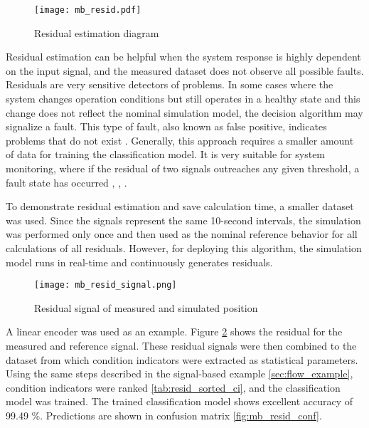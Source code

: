\begin{figure}[h!]
    \centering
    \texttt{[image: mb\_resid.pdf]}
    \caption{Residual estimation diagram}
    \label{fig:mb_resid_workflow}
\end{figure}

Residual estimation can be helpful when the system response is highly
dependent on the input signal, and the measured dataset does not observe
all possible faults. Residuals are very sensitive detectors of problems. In
some cases where the system changes operation conditions but still operates
in a healthy state and this change does not reflect the nominal simulation
model, the decision algorithm may signalize a fault. This type of fault,
also known as false positive, indicates problems that do not exist
\cite{fdi_site}.
Generally, this approach requires a smaller amount of data for training the
classification model. It is very suitable for system monitoring, where if
the residual of two signals outreaches any given threshold, a fault state
has occurred \cite{fdi_site}, \cite{matlab_full}, \cite{isermann_fdi}. 



To demonstrate residual estimation and save calculation time, a smaller
dataset was used. Since the signals represent the same 10-second intervals,
the simulation was performed only once and then used as the nominal
reference behavior for all calculations of all residuals. However, for
deploying this algorithm, the simulation model runs in real-time and
continuously generates residuals.

\begin{figure}[h!]
    \centering
    \texttt{[image: mb\_resid\_signal.png]}
    \caption{Residual signal of measured and simulated position}
    \label{fig:mb_resid_signal}
\end{figure}

A linear encoder was used as an example. Figure \ref{fig:mb_resid_signal} shows the residual
for the measured and reference signal. These residual signals were then
combined to the dataset from which condition indicators were extracted as
statistical parameters.  Using the same steps described in the signal-based
example \ref{sec:flow_example}, condition indicators were ranked
\ref{tab:resid_sorted_ci}, and the
classification model was trained. The trained classification model shows
excellent accuracy of 99.49 \%. Predictions are shown in confusion matrix
\ref{fig:mb_resid_conf}.

